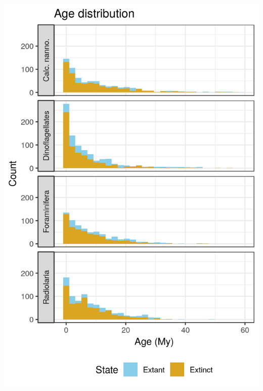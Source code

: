 \documentclass{beamer}
\begin{document}
\begin{frame}
\begin{columns}
\begin{column}{0.5\textwidth}
      \includegraphics[width=\textwidth,height=0.8\textheight,keepaspectratio=true]{../results/figure/age_label}
    \end{column}
  \end{columns}

\end{frame}
\end{document}
